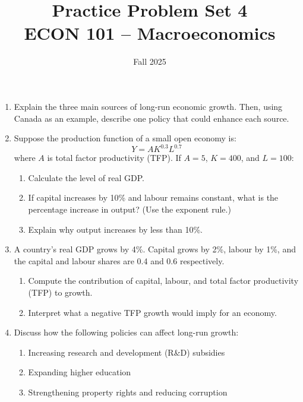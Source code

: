 \documentclass[12pt]{article}
\title{Practice Problem Set 4\\ \vspace{10pt} \large ECON 101 -- Macroeconomics}
\author{}
\date{ \vspace{-30pt} Fall 2025}
\begin{document}
\maketitle





\begin{enumerate}[label=\textbf{\arabic*.}, leftmargin=1.5em]

\item Explain the three main sources of long-run economic growth. Then, using Canada as an example, describe one policy that could enhance each source.

\vspace{1em}

\item Suppose the production function of a small open economy is:
\[
Y = A K^{0.3} L^{0.7}
\]
where $A$ is total factor productivity (TFP). If $A = 5$, $K = 400$, and $L = 100$:

\begin{enumerate}[label=(\alph*)]
\item Calculate the level of real GDP.
\item If capital increases by 10\% and labour remains constant, what is the percentage increase in output? (Use the exponent rule.)
\item Explain why output increases by less than 10\%.
\end{enumerate}

\vspace{1em}

\item A country’s real GDP grows by 4\%. Capital grows by 2\%, labour by 1\%, and the capital and labour shares are 0.4 and 0.6 respectively.

\begin{enumerate}[label=(\alph*)]
\item Compute the contribution of capital, labour, and total factor productivity (TFP) to growth.
\item Interpret what a negative TFP growth would imply for an economy.
\end{enumerate}

\vspace{1em}

\item Discuss how the following policies can affect long-run growth:
\begin{enumerate}[label=(\alph*)]
\item Increasing research and development (R\&D) subsidies
\item Expanding higher education
\item Strengthening property rights and reducing corruption
\end{enumerate}

\end{enumerate}
\end{document}
